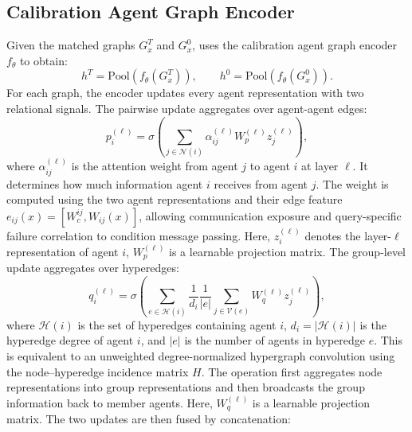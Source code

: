 \subsection{Calibration Agent Graph Encoder}
Given the matched graphs \(G_x^T\) and \(G_x^0\), \methodname{}
uses the calibration agent graph encoder \(f_\theta\) to obtain:
\begin{equation}
    h^T = \mathrm{Pool}\!\left(f_\theta(G_x^T)\right),
    \qquad
    h^0 = \mathrm{Pool}\!\left(f_\theta(G_x^0)\right).
\end{equation}
For each graph, the encoder updates every agent representation with two
relational signals. The pairwise update aggregates over agent-agent edges:
\begin{equation}
    p_i^{(\ell)}
    =
    \sigma\!\left(
    \sum_{j\in\mathcal{N}(i)}
    \alpha_{ij}^{(\ell)}
    W_p^{(\ell)} z_j^{(\ell)}
    \right),
\end{equation}
where \(\alpha_{ij}^{(\ell)}\) is the attention weight from agent \(j\) to
agent \(i\) at layer \(\ell\). It determines how much information agent
\(i\) receives from agent \(j\). The weight is computed using the two agent representations and their edge feature
\(e_{ij}(x)=[W_c^{ij}, W_{ij}(x)]\), allowing communication exposure and query-specific failure correlation to condition message passing. Here, \(z_i^{(\ell)}\) denotes the layer-\(\ell\)
representation of agent \(i\), \(W_p^{(\ell)}\) is a learnable projection matrix.
The group-level update aggregates over hyperedges:
\begin{equation}
    q_i^{(\ell)}
    =
    \sigma\!\left(
    \sum_{e\in\mathcal{H}(i)}
    \frac{1}{d_i}
    \frac{1}{|e|}
    \sum_{j\in \mathcal{V}(e)}
    W_q^{(\ell)} z_j^{(\ell)}
    \right),
\end{equation}
where \(\mathcal{H}(i)\) is the set of hyperedges containing agent \(i\), 
\(d_i = |\mathcal{H}(i)|\) is the hyperedge degree of agent \(i\), and 
\(|e|\) is the number of agents in hyperedge \(e\). 
This is equivalent to an unweighted degree-normalized hypergraph convolution using the node--hyperedge incidence matrix \(H\).
The operation first aggregates node representations into group representations and then broadcasts the group information back to member agents. 
Here, $W_q^{(\ell)}$ is a learnable projection matrix.
The two updates are then fused by concatenation:
